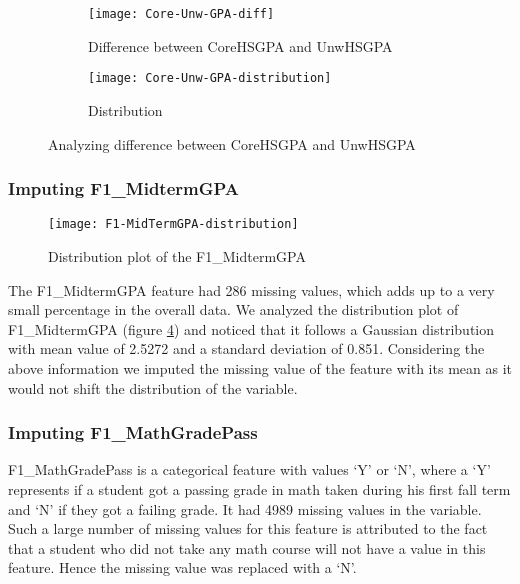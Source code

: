 \documentclass[11pt,openright]{report}
\begin{document}
\begin{figure}[!htbp]
\centering
    \begin{subfigure}[b]{0.55\textwidth}            
            \texttt{[image: Core-Unw-GPA-diff]}
            \caption{Difference between CoreHSGPA and UnwHSGPA}
            \label{fig:Core_Unw_diff}
    \end{subfigure}%
    \begin{subfigure}[b]{0.55\textwidth}
            \centering
            \texttt{[image: Core-Unw-GPA-distribution]}
            \caption{Distribution }
            \label{fig:Core_Unw_dist}
    \end{subfigure}
    \caption{Analyzing difference between CoreHSGPA and UnwHSGPA }\label{fig:diffHSGPA}
\end{figure}

\subsubsection {Imputing F1\_MidtermGPA}

\begin{figure}[!ht]
	\centering
	\texttt{[image: F1-MidTermGPA-distribution]}
	\caption{Distribution plot of the F1\_MidtermGPA}
	\label{fig:F1_MidtermGPA_plot}
\end{figure}

The F1\_MidtermGPA feature had 286 missing values, which adds up to a very small percentage in the overall data. We analyzed the distribution plot of F1\_MidtermGPA (figure \ref{fig:F1_MidtermGPA_plot}) and noticed that it follows a Gaussian distribution with mean value of 2.5272 and a standard deviation of 0.851. Considering the above information we imputed the missing value of the feature with its mean as it would not shift the distribution of the variable.

\subsubsection {Imputing F1\_MathGradePass}
F1\_MathGradePass is a categorical feature with values `Y' or `N', where a `Y' represents if a student got a passing grade in math taken during his first fall term and `N' if they got a failing grade. It had 4989 missing values in the variable. Such a large number of missing values for this feature is attributed to the fact that a student who did not take any math course will not have a value in this feature. Hence the missing value was replaced with a `N'.
\end{document}
